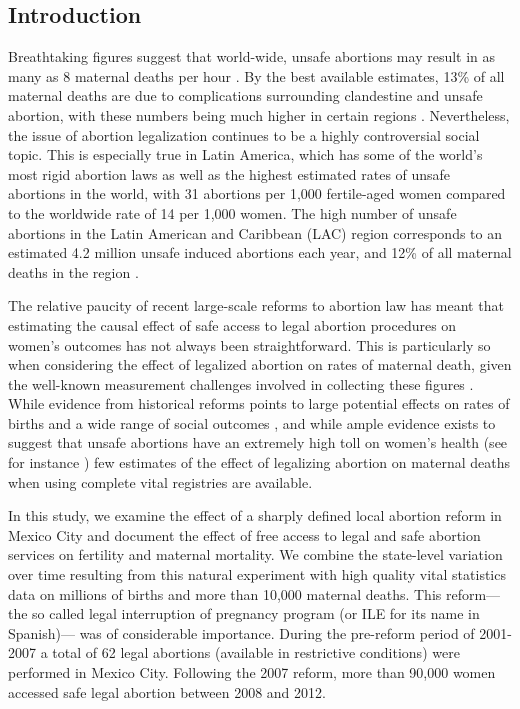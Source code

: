 \documentclass[a4paper, 11pt]{article}
\begin{document}
\begin{spacing}{2}
\section{Introduction}
Breathtaking figures suggest that world-wide, unsafe abortions may result in as many as 8 maternal deaths per hour \citep{TheLancet2009}.  By the best available estimates, 13\% of all maternal deaths are due to complications surrounding clandestine and unsafe abortion, with these numbers being much higher in certain regions \citep{WHO2011}.  Nevertheless, the issue of abortion legalization continues to be a highly controversial social topic.  This is especially true in Latin America, which has some of the world's most rigid abortion laws \citep{UN2014} as well as the highest estimated rates of unsafe abortions in the world, with 31 abortions per 1,000 fertile-aged women compared to the worldwide rate of 14 per 1,000 women. The high number of unsafe abortions in the Latin American and Caribbean (LAC) region corresponds to an estimated 4.2 million unsafe induced abortions each year, and 12\% of all maternal deaths in the region \citep{WHO2011}.

The relative paucity of recent large-scale reforms to abortion law has meant that estimating the causal effect of safe access to legal abortion procedures on women's outcomes has not always been straightforward.  This is particularly so when considering the effect of legalized abortion on rates of maternal death, given the well-known measurement challenges involved in collecting these figures \citep{hogan2010maternal}.  While evidence from historical reforms points to large potential effects on rates of births and a wide range of social outcomes \citep{Ananatetal2009,AngristEvans,DonohueLevitt2001,CharlesStephens2002,Baileyetal2013,Pop-Eleches}, and while ample evidence exists to suggest that unsafe abortions have an extremely high toll on women's health (see for instance \cite{Grimes2006}) few estimates of the effect of legalizing abortion on maternal deaths when using complete vital registries are available.

In this study, we examine the effect of a sharply defined local abortion reform in Mexico City and document the effect of free access to legal and safe abortion services on fertility and maternal mortality.  We combine the state-level variation over time resulting from this natural experiment with high quality vital statistics data on millions of births and more than 10,000 maternal deaths.  This reform---the so called legal interruption of pregnancy program (or ILE for its name in Spanish)--- was of considerable importance.  During the pre-reform period of 2001-2007 a total of 62 legal abortions (available in restrictive conditions) were performed in Mexico City.  Following the 2007 reform, more than 90,000 women accessed safe legal abortion between 2008 and 2012.


\end{spacing}
\end{document}
